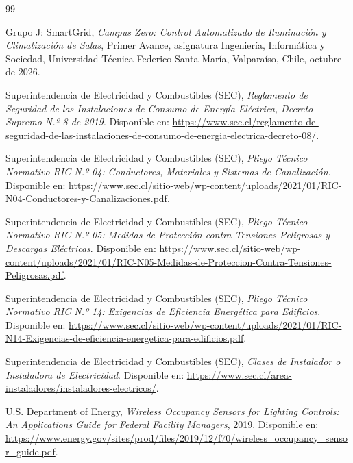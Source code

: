 

\begin{thebibliography}{99}

Grupo J: SmartGrid,
\emph{Campus Zero: Control Automatizado de Iluminación y Climatización de Salas},
Primer Avance, asignatura Ingeniería, Informática y Sociedad,
Universidad Técnica Federico Santa María, Valparaíso, Chile,
octubre de 2026.

Superintendencia de Electricidad y Combustibles (SEC),
\emph{Reglamento de Seguridad de las Instalaciones de Consumo
de Energía Eléctrica, Decreto Supremo N.º 8 de 2019}.
Disponible en:
\url{https://www.sec.cl/reglamento-de-seguridad-de-las-instalaciones-de-consumo-de-energia-electrica-decreto-08/}.

Superintendencia de Electricidad y Combustibles (SEC),
\emph{Pliego Técnico Normativo RIC N.º 04:
Conductores, Materiales y Sistemas de Canalización}.
Disponible en:
\url{https://www.sec.cl/sitio-web/wp-content/uploads/2021/01/RIC-N04-Conductores-y-Canalizaciones.pdf}.

Superintendencia de Electricidad y Combustibles (SEC),
\emph{Pliego Técnico Normativo RIC N.º 05:
Medidas de Protección contra Tensiones Peligrosas
y Descargas Eléctricas}.
Disponible en:
\url{https://www.sec.cl/sitio-web/wp-content/uploads/2021/01/RIC-N05-Medidas-de-Proteccion-Contra-Tensiones-Peligrosas.pdf}.

Superintendencia de Electricidad y Combustibles (SEC),
\emph{Pliego Técnico Normativo RIC N.º 14:
Exigencias de Eficiencia Energética para Edificios}.
Disponible en:
\url{https://www.sec.cl/sitio-web/wp-content/uploads/2021/01/RIC-N14-Exigencias-de-eficiencia-energetica-para-edificios.pdf}.

Superintendencia de Electricidad y Combustibles (SEC),
\emph{Clases de Instalador o Instaladora de Electricidad}.
Disponible en:
\url{https://www.sec.cl/area-instaladores/instaladores-electricos/}.

U.S. Department of Energy,
\emph{Wireless Occupancy Sensors for Lighting Controls:
An Applications Guide for Federal Facility Managers},
2019.
Disponible en:
\url{https://www.energy.gov/sites/prod/files/2019/12/f70/wireless_occupancy_sensor_guide.pdf}.


\end{thebibliography}
